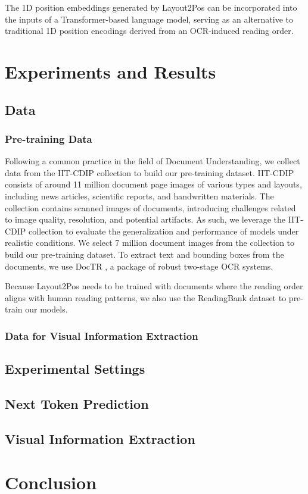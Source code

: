 The 1D position embeddings generated by Layout2Pos can be incorporated into the inputs of a Transformer-based language model, serving as an alternative to traditional 1D position encodings derived from an OCR-induced reading order.


\section{Experiments and Results}

\subsection{Data}

\subsubsection{Pre-training Data}

Following a common practice in the field of Document Understanding, we collect data from the IIT-CDIP collection \citep{lewis2006building} to build our pre-training dataset. IIT-CDIP consists of around 11 million document page images of various types and layouts, including news articles, scientific reports, and handwritten materials. The collection contains scanned images of documents, introducing challenges related to image quality, resolution, and potential artifacts. As such, we leverage the IIT-CDIP collection to evaluate the generalization and performance of models under realistic conditions. We select 7 million document images from the collection to build our pre-training dataset. To extract text and bounding boxes from the documents, we use DocTR \citep{doctr2021}, a package of robust two-stage \ac{OCR} systems.


Because Layout2Pos needs to be trained with documents where the reading order aligns with human reading patterns, we also use the ReadingBank dataset \citep{wang2021layoutreader} to pre-train our models. 

\subsubsection{Data for Visual Information Extraction}

\subsection{Experimental Settings}

\subsection{Next Token Prediction}

\subsection{Visual Information Extraction}

\section{Conclusion}